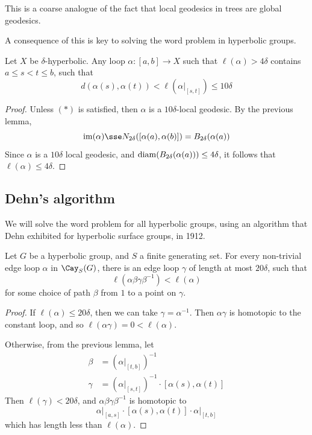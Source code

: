 \documentclass{article}
\begin{document}
\begin{remark}
    This is a coarse analogue of the fact that local geodesics in trees are global geodesics.
\end{remark}

A consequence of this is key to solving the word problem in hyperbolic groups.

\begin{lemma}
    Let \(X\) be \(\delta\)-hyperbolic. Any loop \(\alpha : [a, b] \to X\) such that \(\ell(\alpha) > 4\delta\) contains \(a \le s < t \le b\), such that 
    \[d(\alpha(s), \alpha(t)) < \ell(\alpha\vert_{[s, t]}) \le 10\delta \tag{\(*\)}\]
\end{lemma}

\begin{proof}
    Unless \((*)\) is satisfied, then \(\alpha\) is a \(10\delta\)-local geodesic. By the previous lemma, 
    \[\im(\alpha) \sse N_{2\delta}([\alpha(a), \alpha(b)]) = B_{2\delta}(\alpha(a))\]
    Since \(\alpha\) is a \(10\delta\) local geodesic, and \(\operatorname{diam}(B_{2\delta}(\alpha(a)))\le 4\delta\), it follows that \(\ell(\alpha) \le 4\delta\).
\end{proof}

\lec

\subsection{Dehn's algorithm}

We will solve the word problem for all hyperbolic groups, using an algorithm that Dehn exhibited for hyperbolic surface groups, in 1912.

\begin{theorem}
     Let \(G\) be a hyperbolic group, and \(S\) a finite generating set. For every non-trivial edge loop \(\alpha\) in \(\Cay_S(G)\), there is an edge loop \(\gamma\) of length at most \(20\delta\), such that
    \[\ell(\alpha\beta\gamma\beta^{-1}) < \ell(\alpha)\]
    for some choice of path \(\beta\) from \(1\) to a point on \(\gamma\).
\end{theorem}

\begin{proof}
    If \(\ell(\alpha) \le 20\delta\), then we can take \(\gamma = \alpha^{-1}\). Then \(\alpha\gamma\) is homotopic to the constant loop, and so \(\ell(\alpha\gamma) = 0 < \ell(\alpha)\).

    Otherwise, from the previous lemma, let
    \begin{align*}
        \beta &= (\alpha\vert_{[t, b]})^{-1} \\
        \gamma &= (\alpha\vert_{[s, t]})^{-1}\cdot [\alpha(s), \alpha(t)]
    \end{align*}
    Then \(\ell(\gamma) < 20\delta\), and \(\alpha\beta\gamma\beta^{-1}\) is homotopic to
    \[\alpha\vert_{[a, s]}\cdot[\alpha(s), \alpha(t)]\cdot \alpha\vert_{[t, b]}\]
    which has length less than \(\ell(\alpha)\).
\end{proof}
\end{document}
